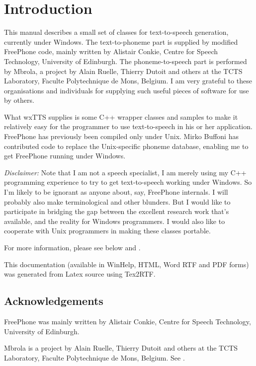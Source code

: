 \chapter{Introduction}\label{introduction}
%
%
\setfooter{\thepage}{}{}{}{}{\thepage}%

This manual describes a small set of classes for text-to-speech generation, currently
under Windows.
The text-to-phoneme part is supplied by modified FreePhone code, mainly written by
Alistair Conkie, Centre for Speech Technology, University of Edinburgh. The
phoneme-to-speech part is performed by Mbrola, a project by Alain Ruelle, Thierry Dutoit and
others at the TCTS Laboratory, Faculte Polytechnique de Mons, Belgium. I am
very grateful to these organisations and individuals for supplying
such useful pieces of software for use by others.

What wxTTS supplies is some C++ wrapper classes and samples to make it relatively easy for
the programmer to use text-to-speech in his or her application. FreePhone
has previously been compiled only under Unix. Mirko Buffoni has contributed
code to replace the Unix-specific phoneme database, enabling me to get FreePhone
running under Windows.

{\it Disclaimer:} Note that I am not a speech specialist, I am merely using my
C++ programming experience to try to get text-to-speech
working under Windows. So I'm likely to be ignorant as anyone about, say, FreePhone internals.
I will probably also make terminological and other blunders. But I would like
to participate in bridging the gap between the excellent research work that's available, and
the reality for Windows programmers. I would also like to cooperate with Unix programmers
in making these classes portable.

For more information, please see below and .

This documentation (available in WinHelp, HTML, Word RTF and PDF forms) was generated from Latex
source using Tex2RTF.

\section{Acknowledgements}

FreePhone was mainly written by Alistair Conkie, Centre for Speech Technology, University of Edinburgh.

Mbrola is a project by Alain Ruelle, Thierry Dutoit and others at the TCTS Laboratory,
Faculte Polytechnique de Mons, Belgium. See .

